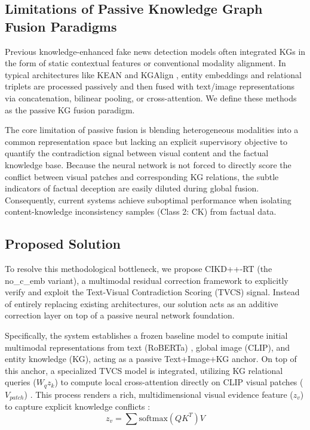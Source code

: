 \subsection{Limitations of Passive Knowledge Graph Fusion Paradigms}
Previous knowledge-enhanced fake news detection models often integrated KGs in the form of static contextual features or conventional modality alignment. In typical architectures like KEAN \cite{ref5} and KGAlign \cite{ref5}, entity embeddings and relational triplets are processed passively and then fused with text/image representations via concatenation, bilinear pooling, or cross-attention. We define these methods as the passive KG fusion paradigm.

The core limitation of passive fusion is blending heterogeneous modalities into a common representation space but lacking an explicit supervisory objective to quantify the contradiction signal between visual content and the factual knowledge base. Because the neural network is not forced to directly score the conflict between visual patches and corresponding KG relations, the subtle indicators of factual deception are easily diluted during global fusion. Consequently, current systems achieve suboptimal performance when isolating content-knowledge inconsistency samples (Class 2: CK) from factual data.

\subsection{Proposed Solution}
To resolve this methodological bottleneck, we propose CIKD++-RT (the no\_c\_emb variant), a multimodal residual correction framework to explicitly verify and exploit the Text-Visual Contradiction Scoring (TVCS) signal. Instead of entirely replacing existing architectures, our solution acts as an additive correction layer on top of a passive neural network foundation.

Specifically, the system establishes a frozen baseline model to compute initial multimodal representations from text (RoBERTa) \cite{ref6}, global image (CLIP), and entity knowledge (KG), acting as a passive Text+Image+KG anchor. On top of this anchor, a specialized TVCS model is integrated, utilizing KG relational queries ($W_q z_k$) to compute local cross-attention directly on CLIP visual patches ($V_{patch}$) \cite{ref7}. This process renders a rich, multidimensional visual evidence feature ($z_v$) to capture explicit knowledge conflicts \cite{ref8}:
\begin{equation}
z_v = \sum \text{softmax}(Q K^T) V
\end{equation}

